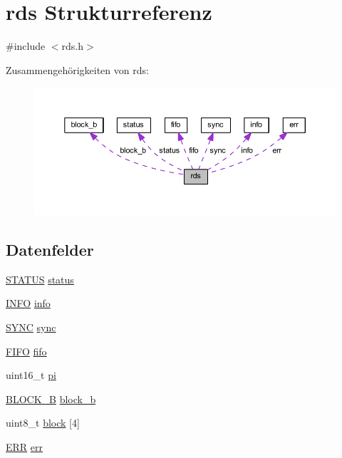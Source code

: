 \hypertarget{structrds}{}\section{rds Strukturreferenz}
\label{structrds}


{\ttfamily \#include $<$rds.\+h$>$}



Zusammengehörigkeiten von rds\+:\nopagebreak
\begin{figure}[H]
\begin{center}
\leavevmode
\includegraphics[width=350pt]{structrds__coll__graph}
\end{center}
\end{figure}
\subsection*{Datenfelder}
\begin{DoxyCompactItemize}
\item 
\hyperlink{rds_8h_ada2ef00c464f9ae8ec73e127ea6a4520}{S\+T\+A\+T\+U\+S} \hyperlink{structrds_a1025e6cbbd3179d2d91b9b4afb8f8efc}{status}
\item 
\hyperlink{rds_8h_a4d0cac7fd06c1f9b01c6a67516c95cfb}{I\+N\+F\+O} \hyperlink{structrds_a8936b68dc62d34c0bd4298d71e811a89}{info}
\item 
\hyperlink{rds_8h_a09f25e919a775a5955c4fb87155e2762}{S\+Y\+N\+C} \hyperlink{structrds_aa779e41fc5dcd8e1471033612c290b23}{sync}
\item 
\hyperlink{rds_8h_a632395f1ea2941b14cb3baef84705059}{F\+I\+F\+O} \hyperlink{structrds_a7f4b3988a39d63bbb74e44a08285d9ef}{fifo}
\item 
uint16\+\_\+t \hyperlink{structrds_ad1803744db28ac0d226ec8da9134598e}{pi}
\item 
\hyperlink{rds_8h_acde5bba1b29ae92f2d1c088cbc0e40bd}{B\+L\+O\+C\+K\+\_\+\+B} \hyperlink{structrds_ad8c59b1a87492b568b0bf85aef6f5f87}{block\+\_\+b}
\item 
uint8\+\_\+t \hyperlink{structrds_af966591bcdc65611d3f9ec47cd36d52a}{block} \mbox{[}4\mbox{]}
\item 
\hyperlink{rds_8h_aa7225a8602f1106cb23bf648d85efb2c}{E\+R\+R} \hyperlink{structrds_a533130a85d028e42078891666dd6c6fc}{err}
\end{DoxyCompactItemize}


